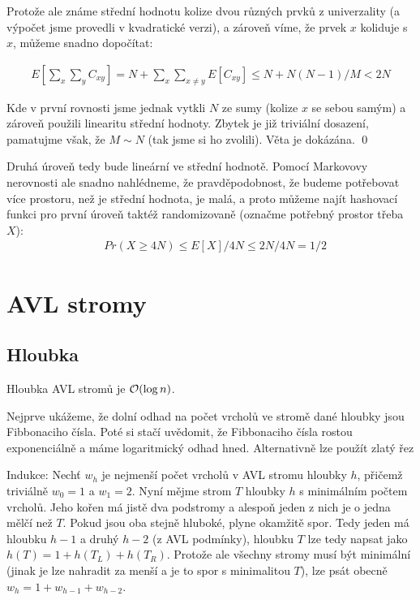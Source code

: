 \documentclass{article}
\begin{document}
Protože ale známe střední hodnotu kolize dvou různých prvků z univerzality (a 
výpočet jsme provedli v kvadratické verzi), a zároveň víme, že prvek $x$ 
koliduje s $x$, můžeme snadno dopočítat:

\begin{align}
	E[\sum_x\sum_y C_{xy}] = N + \sum_x\sum_{x\neq y} E[C_{xy}] \leq N + 
	N(N-1)/M < 2N
\end{align}

Kde v první rovnosti jsme jednak vytkli $N$ ze sumy (kolize $x$ se sebou samým) 
a zároveň použili linearitu střední hodnoty. Zbytek je již triviální dosazení,
pamatujme však, že $M \sim N$ (tak jsme si ho zvolili).  
Věta je dokázána.
\qed

Druhá úroveň tedy bude lineární ve střední hodnotě. Pomocí Markovovy nerovnosti
ale snadno nahlédneme, že pravděpodobnost, že budeme potřebovat více prostoru,
než je střední hodnota, je malá, a proto můžeme najít hashovací funkci pro první úroveň taktéž
randomizovaně (označme potřebný prostor třeba $X$):
\begin{align}
	&Pr(X \geq 4N) \leq E[X] / 4N \leq 2N / 4N = 1/2
\end{align}


\section{AVL stromy}
\subsection{Hloubka}
\vt Hloubka AVL stromů je $\mathcal{O}(\log n)$.

\dk Nejprve ukážeme, že dolní odhad na počet vrcholů ve stromě dané hloubky jsou 
Fibbonaciho čísla. Poté si stačí uvědomit, že Fibbonaciho čísla rostou 
exponenciálně a máme logaritmický odhad hned. Alternativně lze použít zlatý řez

Indukce: Nechť $w_h$ je nejmenší počet vrcholů v AVL stromu hloubky $h$, přičemž 
triviálně $w_0 = 1$ a $w_1 = 2$. Nyní mějme strom $T$ hloubky $h$ s minimálním 
počtem vrcholů.  Jeho kořen má jistě dva podstromy a alespoň jeden z nich je o 
jedna mělčí než $T$.  Pokud jsou oba stejně hluboké, plyne okamžitě spor. Tedy 
jeden má hloubku $h-1$ a druhý $h-2$ (z AVL podmínky), hloubku $T$ lze tedy 
napsat jako $h(T) = 1 + h(T_L) + h(T_R)$. Protože ale všechny stromy musí být 
minimální (jinak je lze nahradit za menší a je to spor s minimalitou $T$), lze 
psát obecně $w_h = 1 + w_{h-1} + w_{h-2}$.
\end{document}
